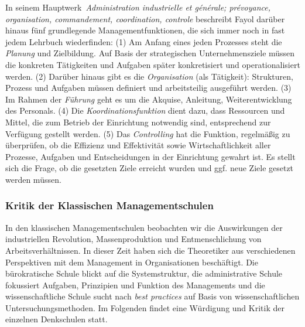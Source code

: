 \documentclass[
  letterpaper,
]{book}
\begin{document}
In seinem Hauptwerk~\emph{Administration industrielle et générale;
prévoyance, organisation, commandement, coordination, controle}
beschreibt Fayol darüber hinaus fünf grundlegende Managementfunktionen,
die sich immer noch in fast jedem Lehrbuch wiederfinden: (1) Am Anfang
eines jeden Prozesses steht die \emph{Planung} und Zielbildung. Auf
Basis der strategischen Unternehmensziele müssen die konkreten
Tätigkeiten und Aufgaben später konkretisiert und operationalisiert
werden. (2) Darüber hinaus gibt es die \emph{Organisation} (als
Tätigkeit): Strukturen, Prozess und Aufgaben müssen definiert und
arbeitsteilig ausgeführt werden. (3) Im Rahmen der \emph{Führung }geht
es um die Akquise, Anleitung, Weiterentwicklung des Personals. (4) Die
\emph{Koordinationsfunktion} dient dazu, dass Ressourcen und Mittel, die
zum Betrieb der Einrichtung notwendig sind, entsprechend zur Verfügung
gestellt werden. (5) Das \emph{Controlling} hat die Funktion, regelmäßig
zu überprüfen, ob die Effizienz und Effektivität sowie
Wirtschaftlichkeit aller Prozesse, Aufgaben und Entscheidungen in der
Einrichtung gewahrt ist. Es stellt sich die Frage, ob die gesetzten
Ziele erreicht wurden und ggf. neue Ziele gesetzt werden müssen.

\subsubsection{Kritik der Klassischen
Managementschulen}\label{kritik-klassische-managementschulen}

In den klassischen Managementschulen beobachten wir die Auswirkungen der
industriellen Revolution, Massenproduktion und Entmenschlichung von
Arbeitsverhältnissen. In dieser Zeit haben sich die Theoretiker aus
verschiedenen Perspektiven mit dem Management in Organisationen
beschäftigt. Die bürokratische Schule blickt auf die Systemstruktur, die
administrative Schule fokussiert Aufgaben, Prinzipien und Funktion des
Managements und die wissenschaftliche Schule sucht nach \emph{best
practices} auf Basis von wissenschaftlichen Untersuchungsmethoden. Im
Folgenden findet eine Würdigung und Kritik der einzelnen Denkschulen
statt.
\end{document}
